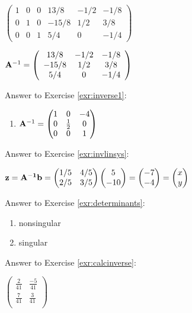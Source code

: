 \documentclass[]{book}
\providecommand{\tightlist}{%
  \setlength{\itemsep}{0pt}\setlength{\parskip}{0pt}}
\theoremstyle{definition}
\theoremstyle{definition}
\theoremstyle{definition}
\theoremstyle{remark}
\begin{document}
\(\left(\begin{array}{ccc|ccc}  1&0&0&13/8 &-1/2&-1/8\\  0&1&0&-15/8&1/2 &3/8\\  0&0&1&5/4 &0 &-1/4 \end{array} \right)\)

\({\bf A}^{-1} = \left(\begin{array}{ccc}  13/8 &-1/2&-1/8\\  -15/8&1/2 &3/8\\  5/4 &0 &-1/4 \end{array} \right)\)

Answer to Exercise \ref{exr:inverse1}:

\begin{enumerate}
\def\labelenumi{\arabic{enumi}.}
\tightlist
\item
  \({\bf A}^{-1}=\begin{pmatrix} 1&0&-4\\0&\frac{1}{2}&0\\0&0&1 \end{pmatrix}\)
\end{enumerate}

Answer to Exercise \ref{exr:invlinsys}:

\(\textbf{z} = \bf{A}^{-1} \bf{b} = \begin{pmatrix}  1/5 &4/5\\  2/5&3/5 \end{pmatrix} \begin{pmatrix}  5 \\  -10 \end{pmatrix}= \begin{pmatrix}  -7 \\  -4 \end{pmatrix} = \begin{pmatrix}  x \\  y \end{pmatrix}\)

Answer to Exercise \ref{exr:determinants}:

\begin{enumerate}
\def\labelenumi{\arabic{enumi}.}
\item
  nonsingular
\item
  singular
\end{enumerate}

Answer to Exercise \ref{exr:calcinverse}:

\(\begin{pmatrix}  \frac{2}{41} & \frac{-5}{41}\\  \frac{7}{41} & \frac{3}{41}\\  \end{pmatrix}\)
\end{document}
